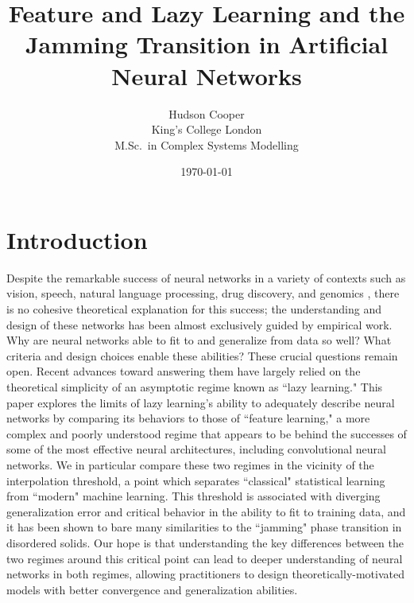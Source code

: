 \documentclass[11pt]{article}
\begin{document}
\title{\bf Feature and Lazy Learning and the Jamming Transition in Artificial Neural Networks}
\author{
    Hudson Cooper\\ %
    King's College London\\
    M.Sc.\ in Complex Systems Modelling
}
\date{\today}

\begin{titlingpage}
\maketitle
\begin{abstract}
\lipsum[1]
\end{abstract}
\end{titlingpage}

\tableofcontents

\section{Introduction}
Despite the remarkable success of neural networks in a variety of contexts such as vision, speech, natural language processing, drug discovery, and genomics \cite{lecunDeepLearning2015}, there is no cohesive theoretical explanation for this success; the understanding and design of these networks has been almost exclusively guided by empirical work. \\

Why are neural networks able to fit to and generalize from data so well? What criteria and design choices enable these abilities? These crucial questions remain open. Recent advances toward answering them have largely relied on the theoretical simplicity of an asymptotic regime known as ``lazy learning." This paper explores the limits of lazy learning's ability to adequately describe neural networks by comparing its behaviors to those of ``feature learning," a more complex and poorly understood regime that appears to be behind the successes of some of the most effective neural architectures, including convolutional neural networks. We in particular compare these two regimes in the vicinity of the interpolation threshold, a point which separates ``classical" statistical learning from ``modern" machine learning. This threshold is associated with diverging generalization error and critical behavior in the ability to fit to training data, and it has been shown to bare many similarities to the ``jamming" phase transition in disordered solids. Our hope is that understanding the key differences between the two regimes around this critical point can lead to deeper understanding of neural networks in both regimes, allowing practitioners to design theoretically-motivated models with better convergence and generalization abilities.\\
\end{document}
